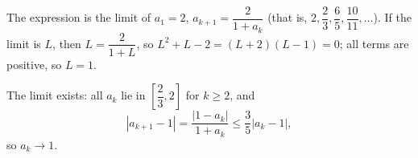 The expression is the limit of $a_1=2$, $a_{k+1}=\dfrac{2}{1+a_k}$ (that is, $2,\dfrac23,\dfrac65,\dfrac{10}{11},\dots$). If the limit is $L$, then $L=\dfrac{2}{1+L}$, so $L^2+L-2=(L+2)(L-1)=0$; all terms are positive, so $L=\boxed{1}$.

The limit exists: all $a_k$ lie in $\left[\dfrac23,2\right]$ for $k\ge2$, and
\[\left|a_{k+1}-1\right|=\dfrac{\left|1-a_k\right|}{1+a_k}\le\dfrac35\left|a_k-1\right|,\]
so $a_k\to1$.

